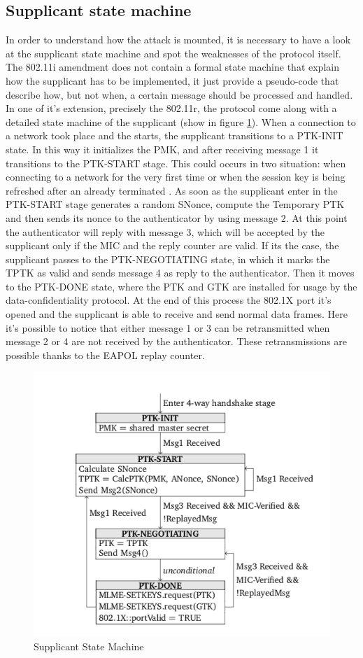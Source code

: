 \subsection{Supplicant state machine}

In order to understand how the attack is mounted, it is necessary to have a look at the supplicant state machine and spot the weaknesses of the protocol itself.
The 802.11i amendment does not contain a formal state machine that explain how the supplicant has to be implemented, it just provide a pseudo-code that describe
how, but not when, a certain message should be processed and handled. In one of it's extension, precisely the 802.11r, the \fwh protocol come along with 
a detailed state machine of the supplicant (show in figure \ref{fig:sup-sm}).
When a connection to a network took place and the \fwh starts, the supplicant transitions to a PTK-INIT state. In this way it initializes the PMK, and 
after receiving message 1 it transitions to the PTK-START stage. This could occurs in two situation: when connecting to a network for the very first time or when the
session key is being refreshed after an already terminated \fwh. As soon as the supplicant enter in the PTK-START stage generates a random SNonce, compute the 
Temporary PTK and then sends its nonce to the authenticator by using message 2. At this point the authenticator will reply with message 3, which will be accepted by the supplicant
only if the MIC and the reply counter are valid. If its the case, the supplicant passes to the PTK-NEGOTIATING state, in which it marks the TPTK as valid and sends message 4 as reply to 
the authenticator. Then it moves to the PTK-DONE state, where the PTK and GTK are installed for usage by the data-confidentiality protocol. At the end of this process
the 802.1X port it's opened and the supplicant is able to receive and send normal data frames. Here it's possible to notice that either message 1 or 3 can be retransmitted 
when message 2 or 4 are not received by the authenticator. These retransmissions are possible thanks to the EAPOL replay counter.


\begin{figure}[tbh]
  \centering
  \includegraphics[width=0.8\linewidth]{images/intro/sup-sm.png}
  \caption[Supplicant State Machine]{Supplicant State Machine}
  \label{fig:sup-sm}
\end{figure}

